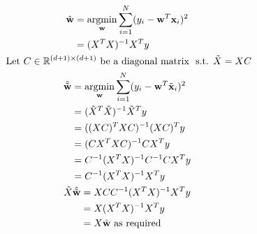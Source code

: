 \documentclass{introtosml}
\begin{document}
\begin{p}
  \item
    \begin{gather*}
      \begin{aligned}
        \hat{\vec{w}}
        & = \argmin_\vec{w} \sum_{i=1}^N (y_i - \vec{w}^T \vec{x}_i)^2 \\
        & = (X^T X)^{-1} X^T y
      \end{aligned} \\
      \text{Let} C \in \field{R}^{(d+1) \times (d+1)} \text{be a diagonal matrix}
          \st \tilde{X} = XC \\
      \begin{aligned}
        \hat{\tilde{\vec{w}}}
        & = \argmin_\vec{w} \sum_{i=1}^N (y_i - \vec{w}^T \tilde{\vec{x}}_i)^2 \\
        & = (\tilde{X}^T \tilde{X})^{-1} \tilde{X}^T y \\
        & = ((XC)^T XC)^{-1} (XC)^T y \\
        & = (CX^T XC)^{-1} CX^T y \\
        & = C^{-1} (X^T X)^{-1} C^{-1} CX^T y \\
        & = C^{-1} (X^T X)^{-1} X^T y
      \end{aligned} \\
      \begin{aligned}
        \tilde{X}\hat{\tilde{\vec{w}}}
        & = XCC^{-1} (X^T X)^{-1} X^T y \\
        & = X (X^T X)^{-1} X^T y \\
        & = X \hat{\vec{w}} \text{as required}
      \end{aligned}
    \end{gather*}


\end{p}
\end{document}
